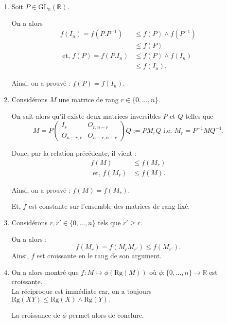 \begin{enumerate}
\item Soit $P\in \mbox{GL}_{n}(\mathbb{R}).$

On a  alors 
\begin{align*}
f(I_{n})=f(P.P^{-1}) & \leq f(P)\wedge f(P^{-1})\\
& \leq f(P)\\
\mbox{ et, } f(P)=f(P.I_{n})& \leq f(P)\wedge f(I_{n})\\
& \leq f(I_{n}).
\end{align*}

Ainsi, on a prouvé : $\displaystyle f(P)=f(I_{n}).$

\item Considérons $M$ une matrice de rang $r\in \{0,\ldots,n\}.$

On sait alors qu'il existe deux matrices inversibles $P$ et $Q$ telles que  $$M=P\left( \begin{array}{ll}
I_{r} & O_{r,n-r}\\
O_{n-r,r} & O_{n-r,n-r}
\end{array}
\right) Q:=PM_{r}Q \mbox{ i.e. } M_{r}=P^{-1}MQ^{-1}.$$

Donc, par la relation précédente, il vient : 
\begin{align*}
f(M) & \leq f(M_{r})\\
\mbox{ et, } f(M_{r}) & \leq f(M).
\end{align*}

Ainsi, on a prouvé : $\displaystyle f(M)=f(M_{r}).$

Et, $f$ est constante sur l'ensemble des matrices de rang fixé.

\item Considérons $r,r'\in \{0,\ldots,n\}$ tels que $r'\geq r.$

On a alors : $$f(M_{r})=f(M_{r}M_{r'})\leq f(M_{r'}).$$
Ainsi, $f$ est croissante en le rang de son argument.
\item On a alors montré que $f: \displaystyle M\mapsto \phi(\mbox{Rg}(M))$ où $\displaystyle \phi : \{0,\ldots,n\}\rightarrow \mathbb{R}$ est croissante.\\ 

La réciproque est immédiate car, on a toujours $\displaystyle \mbox{Rg}(XY)\leq \mbox{Rg}(X)\wedge\mbox{Rg}(Y).$ 

La croissance de $\phi$ permet alors de conclure.
\end{enumerate}


